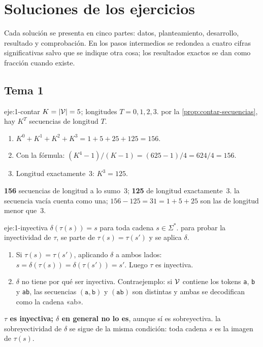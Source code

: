 \chapter{Soluciones de los ejercicios}
\label{ap:soluciones}

Cada solución se presenta en cinco partes: datos, planteamiento, desarrollo, resultado y comprobación. En los pasos intermedios se redondea a cuatro cifras significativas salvo que se indique otra cosa; los resultados exactos se dan como fracción cuando existe.

\section{Tema 1}

\begin{solucion}{eje:1-contar}
\datos $K=\lvert\mathcal{V}\rvert=5$; longitudes $T=0,1,2,3$.
\planteamiento por la \cref{prop:contar-secuencias}, hay $K^{T}$ secuencias de longitud $T$.
\pasos
\begin{enumerate}[label=\arabic*.]
  \item $K^{0}+K^{1}+K^{2}+K^{3}=1+5+25+125=156$.
  \item Con la fórmula: $(K^{4}-1)/(K-1)=(625-1)/4=624/4=156$.
  \item Longitud exactamente~3: $K^{3}=125$.
\end{enumerate}
\resultado \textbf{156} secuencias de longitud a lo sumo~3; \textbf{125} de longitud exactamente~3.
\comprobacion la secuencia vacía cuenta como una; $156-125=31=1+5+25$ son las de longitud menor que~3.
\end{solucion}

\begin{solucion}{eje:1-inyectiva}
\datos $\delta(\tau(s))=s$ para toda cadena $s\in\Sigma^{*}$.
\planteamiento para probar la inyectividad de $\tau$, se parte de $\tau(s)=\tau(s')$ y se aplica $\delta$.
\pasos
\begin{enumerate}[label=\arabic*.]
  \item Si $\tau(s)=\tau(s')$, aplicando $\delta$ a ambos lados: $s=\delta(\tau(s))=\delta(\tau(s'))=s'$. Luego $\tau$ es inyectiva.
  \item $\delta$ no tiene por qué ser inyectiva. Contraejemplo: si $\mathcal{V}$ contiene los tokens \texttt{a}, \texttt{b} y \texttt{ab}, las secuencias $(\texttt{a},\texttt{b})$ y $(\texttt{ab})$ son distintas y ambas se decodifican como la cadena «ab».
\end{enumerate}
\resultado \textbf{$\tau$ es inyectiva; $\delta$ en general no lo es}, aunque sí es sobreyectiva.
\comprobacion la sobreyectividad de $\delta$ se sigue de la misma condición: toda cadena $s$ es la imagen de $\tau(s)$.
\end{solucion}

